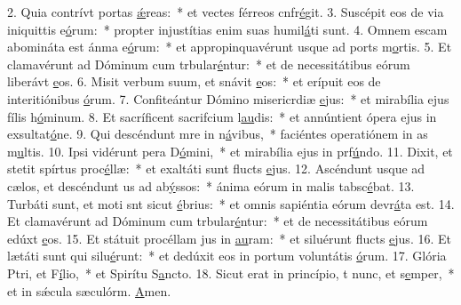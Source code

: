 2. Quia contrívt portas \uline{ǽ}reas:~* et vectes férreos cnfr\uline{é}git.
3. Suscépit eos de via iniquittis e\uline{ó}rum:~* propter injustítias enim suas humil\uline{á}ti sunt.
4. Omnem escam abomináta est ánma e\uline{ó}rum:~* et appropinquavérunt usque ad ports m\uline{o}rtis.
5. Et clamavérunt ad Dóminum cum trbular\uline{é}ntur:~* et de necessitátibus eórum liberávt \uline{e}os.
6. Misit verbum suum, et snávit \uline{e}os:~* et erípuit eos de interitiónibus \uline{ó}rum.
7. Confiteántur Dómino misericrdiæ \uline{e}jus:~* et mirabília ejus fílis h\uline{ó}minum.
8. Et sacríficent sacrifcium l\uline{au}dis:~* et annúntient ópera ejus in exsultat\uline{ó}ne.
9. Qui descéndunt mre in n\uline{á}vibus,~* faciéntes operatiónem in as m\uline{u}ltis.
10. Ipsi vidérunt pera D\uline{ó}mini,~* et mirabília ejus in prf\uline{ú}ndo.
11. Dixit, et stetit spírtus proc\uline{é}llæ:~* et exaltáti sunt flucts \uline{e}jus.
12. Ascéndunt usque ad cælos, et descéndunt us ad ab\uline{ý}ssos:~* ánima eórum in malis tabsc\uline{é}bat.
13. Turbáti sunt, et moti snt sicut \uline{é}brius:~* et omnis sapiéntia eórum devr\uline{á}ta est.
14. Et clamavérunt ad Dóminum cum trbular\uline{é}ntur:~* et de necessitátibus eórum edúxt \uline{e}os.
15. Et státuit procéllam jus in \uline{au}ram:~* et siluérunt flucts \uline{e}jus.
16. Et lætáti sunt qui silu\uline{é}runt:~* et dedúxit eos in portum voluntátis \uline{ó}rum.
17. Glória Ptri, et F\uline{í}lio,~* et Spirítu S\uline{a}ncto.
18. Sicut erat in princípio, t nunc, et s\uline{e}mper,~* et in sǽcula sæculórm. \uline{A}men.
